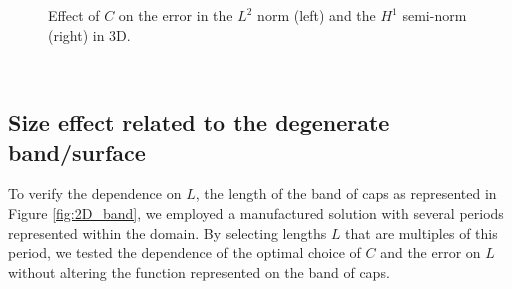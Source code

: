 \documentclass{article}
\theoremstyle{remark}
\begin{document}
\begin{figure}[!ht]
            \caption{Effect of $C$ on the error in the $L^2$ norm (left) and the $H^1$ semi-norm (right) in 3D.}
            \label{fig:coeff_3D}
\end{figure}
\\
\subsection{Size effect related to the degenerate band/surface} \label{sec:L_effect}
To verify the dependence on $L$, the length of the band of caps as represented in Figure \ref{fig:2D_band}, we employed a manufactured solution with several periods represented within the domain. By selecting lengths $L$ that are multiples of this period, we tested the dependence of the optimal choice of $C$ and the error on $L$ without altering the function represented on the band of caps. 
\end{document}

